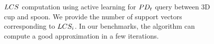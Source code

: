 \begin{figure}[htb]
\begin{center}
\caption[$\LCS$ computation using active learning for $\PDt$ query between 3D cup and spoon]{$\LCS$ computation using active learning for $\PDt$ query between 3D cup and spoon. We provide the number of support vectors corresponding to $LCS_i$. In our benchmarks, the algorithm can compute a good approximation in a few iterations.}
\label{fig:2:LCSinActiveLearning3D}
\end{center}
\end{figure}



